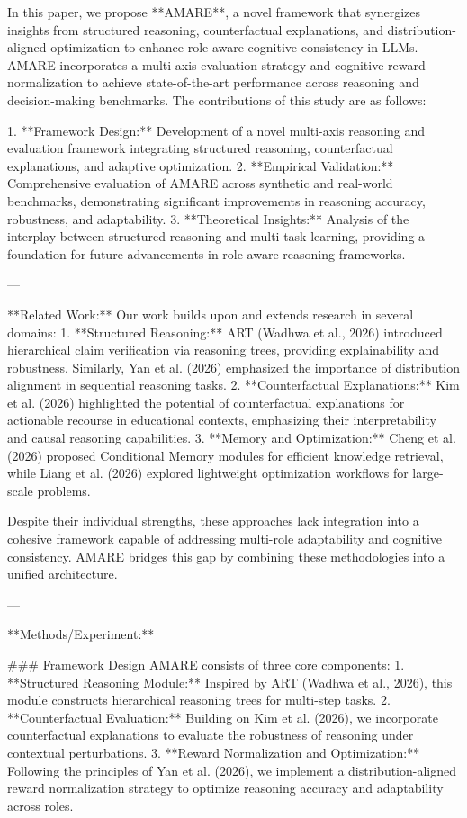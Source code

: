 In this paper, we propose **AMARE**, a novel framework that synergizes insights from structured reasoning, counterfactual explanations, and distribution-aligned optimization to enhance role-aware cognitive consistency in LLMs. AMARE incorporates a multi-axis evaluation strategy and cognitive reward normalization to achieve state-of-the-art performance across reasoning and decision-making benchmarks. The contributions of this study are as follows:

1. **Framework Design:** Development of a novel multi-axis reasoning and evaluation framework integrating structured reasoning, counterfactual explanations, and adaptive optimization.
2. **Empirical Validation:** Comprehensive evaluation of AMARE across synthetic and real-world benchmarks, demonstrating significant improvements in reasoning accuracy, robustness, and adaptability.
3. **Theoretical Insights:** Analysis of the interplay between structured reasoning and multi-task learning, providing a foundation for future advancements in role-aware reasoning frameworks.

---

**Related Work:**  
Our work builds upon and extends research in several domains:  
1. **Structured Reasoning:** ART (Wadhwa et al., 2026) introduced hierarchical claim verification via reasoning trees, providing explainability and robustness. Similarly, Yan et al. (2026) emphasized the importance of distribution alignment in sequential reasoning tasks.  
2. **Counterfactual Explanations:** Kim et al. (2026) highlighted the potential of counterfactual explanations for actionable recourse in educational contexts, emphasizing their interpretability and causal reasoning capabilities.  
3. **Memory and Optimization:** Cheng et al. (2026) proposed Conditional Memory modules for efficient knowledge retrieval, while Liang et al. (2026) explored lightweight optimization workflows for large-scale problems.

Despite their individual strengths, these approaches lack integration into a cohesive framework capable of addressing multi-role adaptability and cognitive consistency. AMARE bridges this gap by combining these methodologies into a unified architecture.

---

**Methods/Experiment:**  

### Framework Design  
AMARE consists of three core components:  
1. **Structured Reasoning Module:** Inspired by ART (Wadhwa et al., 2026), this module constructs hierarchical reasoning trees for multi-step tasks.  
2. **Counterfactual Evaluation:** Building on Kim et al. (2026), we incorporate counterfactual explanations to evaluate the robustness of reasoning under contextual perturbations.  
3. **Reward Normalization and Optimization:** Following the principles of Yan et al. (2026), we implement a distribution-aligned reward normalization strategy to optimize reasoning accuracy and adaptability across roles.

